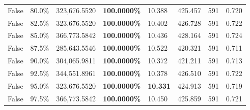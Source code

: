 \begin{table}[H]
\begin{tabular}{lllrllll}
\cline{1-8}
False & 80.0\% & 323,676.5520 & \bfseries \color{red} 100.0000\% & 10.388 & 425.457 & 591 & 0.720 \\
\cline{1-8}
False & 82.5\% & 323,676.5520 & \bfseries \color{red} 100.0000\% & 10.402 & 426.728 & 591 & 0.722 \\
\cline{1-8}
False & 85.0\% & 366,773.5842 & \bfseries \color{red} 100.0000\% & 10.436 & 428.164 & 591 & 0.724 \\
\cline{1-8}
False & 87.5\% & \color{red} 285,643.5546 & \bfseries \color{red} 100.0000\% & 10.522 & 420.321 & 591 & 0.711 \\
\cline{1-8}
False & 90.0\% & 304,065.9811 & \bfseries \color{red} 100.0000\% & 10.372 & 421.211 & 591 & 0.713 \\
\cline{1-8}
False & 92.5\% & 344,551.8961 & \bfseries \color{red} 100.0000\% & 10.378 & 426.510 & 591 & 0.722 \\
\cline{1-8}
False & 95.0\% & 323,676.5520 & \bfseries \color{red} 100.0000\% & \bfseries \color{red} 10.331 & 424.913 & 591 & 0.719 \\
\cline{1-8}
False & 97.5\% & 366,773.5842 & \bfseries \color{red} 100.0000\% & 10.450 & 425.859 & 591 & 0.721 \\
\cline{1-8}
\bottomrule
\end{tabular}
\end{table}
